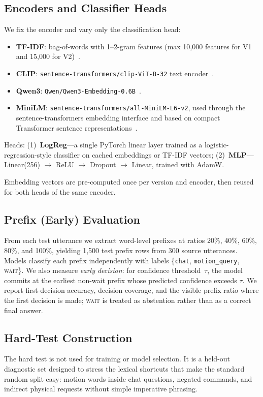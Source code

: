 \documentclass{article}
\begin{document}
\subsection{Encoders and Classifier Heads}
We fix the encoder and vary only the classification head:
\begin{itemize}
  \item \textbf{TF-IDF}: bag-of-words with 1--2-gram features (max 10{,}000
        features for V1 and 15{,}000 for V2)~\cite{salton1988term}.
  \item \textbf{CLIP}: \texttt{sentence-transformers/clip-ViT-B-32} text
        encoder~\cite{radford2021clip}.
  \item \textbf{Qwen3}: \texttt{Qwen/Qwen3-Embedding-0.6B}~\cite{zhang2025qwen3embedding}.
  \item \textbf{MiniLM}: \texttt{sentence-transformers/all-MiniLM-L6-v2},
        used through the sentence-transformers embedding interface and based
        on compact Transformer sentence representations~\cite{reimers2019sentencebert,wang2020minilm}.
\end{itemize}
Heads: (1)~\textbf{LogReg}---a single PyTorch linear layer trained as a
logistic-regression-style classifier on cached embeddings or TF-IDF vectors;
(2)~\textbf{MLP}---Linear(256) $\to$ ReLU $\to$ Dropout $\to$ Linear, trained
with AdamW.

Embedding vectors are pre-computed once per version and encoder, then reused
for both heads of the same encoder.

\subsection{Prefix (Early) Evaluation}
From each test utterance we extract word-level prefixes at ratios
20\%, 40\%, 60\%, 80\%, and 100\%, yielding 1{,}500 test prefix rows from
300 source utterances.
Models classify each prefix independently with labels
\{\texttt{chat}, \texttt{motion\_query}, \textsc{wait}\}.
We also measure \emph{early decision}: for confidence threshold~$\tau$,
the model commits at the earliest non-wait prefix whose predicted confidence
exceeds $\tau$. We report first-decision accuracy, decision coverage, and the
visible prefix ratio where the first decision is made; \textsc{wait} is treated
as abstention rather than as a correct final answer.

\subsection{Hard-Test Construction}
The hard test is not used for training or model selection. It is a held-out
diagnostic set designed to stress the lexical shortcuts that make the standard
random split easy: motion words inside chat questions, negated commands, and
indirect physical requests without simple imperative phrasing.
\end{document}
